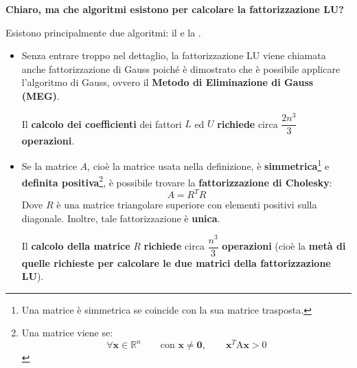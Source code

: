 \begin{flushleft}
    \textcolor{Green3}{ \textbf{Chiaro, ma che algoritmi esistono per calcolare la fattorizzazione LU?}}
\end{flushleft}
Esistono principalmente due algoritmi: il  e la .
\begin{itemize}
    \item Senza entrare troppo nel dettaglio, la fattorizzazione LU viene chiamata anche fattorizzazione di Gauss poiché è dimostrato che è possibile applicare l'algoritmo di Gauss, ovvero il \textbf{Metodo di Eliminazione di Gauss (MEG)}. 
    
    Il \textbf{calcolo dei coefficienti} dei fattori $L$ ed $U$ \textbf{richiede} circa $\dfrac{2n^{3}}{3}$ \textbf{operazioni}.
    
    \item Se la matrice $A$, cioè la matrice usata nella definizione, è \textbf{simmetrica}\footnote{Una matrice è simmetrica se coincide con la sua matrice trasposta.} e \textbf{definita positiva}\footnote{Una matrice viene  se:
    \begin{equation*}
        \forall \mathbf{x} \in \mathbb{R}^{n} \hspace{2em} \text{con } \mathbf{x} \ne \mathbf{0}, \hspace{2em} \mathbf{x}^{T} \mathrm{A}\mathbf{x} > 0
    \end{equation*}}, è possibile trovare la \textbf{fattorizzazione di Cholesky}:
    \begin{equation}\label{eq: fattorizzazione di Cholesky}
        A = R^{T}R
    \end{equation}
    Dove $R$ è una matrice triangolare superiore con elementi positivi sulla diagonale. Inoltre, tale fattorizzazione è \textbf{unica}.

    Il \textbf{calcolo della matrice} $R$ \textbf{richiede} circa $\dfrac{n^{3}}{3}$ \textbf{operazioni} (cioè la \textbf{metà di quelle richieste per calcolare le due matrici della fattorizzazione LU}).
\end{itemize}
